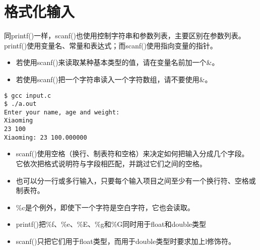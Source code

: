 \section{格式化输入}
\begin{frame}[fragile]\ft{\secname}
\tf 同printf()一样，scanf()也使用控制字符串和参数列表，主要区别在参数列表。printf()使用变量名、常量和表达式；而scanf()使用指向变量的指针。
\end{frame}

\begin{frame}[fragile]
\begin{itemize}
\item 
\tf 若使用scanf()来读取某种基本类型的值，请在变量名前加一个\&。 \\[0.1in]
\item
若使用scanf()把一个字符串读入一个字符数组，请不要使用\&。
\end{itemize}
\end{frame}

\begin{frame}[fragile]

\end{frame}

\begin{frame}[fragile]
\begin{lstlisting}[showspaces=true,backgroundcolor=\color{red!20}]
$ gcc input.c
$ ./a.out
Enter your name, age and weight:
Xiaoming
23 100
Xiaoming: 23 100.000000
\end{lstlisting}
\end{frame}

\begin{frame}[fragile]
\begin{itemize}
\item
\tf scanf()使用空格（换行、制表符和空格）来决定如何把输入分成几个字段。
它依次把格式说明符与字段相匹配，并跳过它们之间的空格。\\[0.1in]
\item
也可以分一行或多行输入，只要每个输入项目之间至少有一个换行符、空格或制表符。\\[0.1in]
\item
\%c是个例外，即使下一个字符是空白字符，它也会读取。
\end{itemize}
\end{frame}

\begin{frame}[fragile]
\begin{itemize}
\item
\tf printf()把\%f、\%e、\%E、\%g和\%G同时用于float和double类型\\[0.1in]
\item
scanf()只把它们用于float类型，而用于double类型时要求加上l修饰符。
\end{itemize}
\end{frame}

